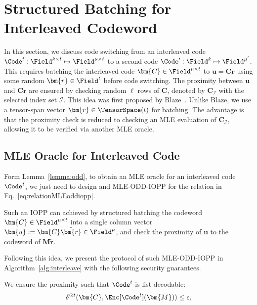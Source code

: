 \section{Structured Batching for Interleaved Codeword}
\label{sec:interleave}

In this section,
we discuss code switching from an interleaved code $\Code^t: \Field^{k\times t} \mapsto \Field^{\mu \times t}$ to a second code $\Code':\Field^{k} \mapsto \Field^{\mu'}$.
This requires batching the interleaved code $\bm{C} \in \Field^{\mu \times t}$ to $\bm{u} = \bm{C}\bm{r}$ using some random $\bm{r} \in \Field^t$ before code switching.
The proximity between $\bm{u}$ and $\bm{C}\bm{r}$ are ensured by checking random $\ell$ rows of $\bm{C}$, denoted by $\bm{C}_\mathcal{I}$ with the selected index set $\mathcal{I}$.
This idea was first proposed by Blaze~\cite{eurocrypt/BrehmCFRRZ25}.
Unlike Blaze, we use a tensor-span vector $\bm{r} \in \TensorSpace(t)$ for batching.
The advantage is that the proximity check is reduced to checking an MLE evaluation of $\bm{C}_\mathcal{I}$,
allowing it to be verified via another MLE oracle.




\subsection{MLE Oracle for Interleaved Code}
\label{sec:interleaveOracle}

Form Lemma~\ref{lemma:odd},
to obtain an MLE oracle for an interleaved code $\Code^t$,
we just need to design and MLE-ODD-IOPP for the relation in Eq.~\ref{eq:relationMLEoddiopp}.

Such an IOPP can achieved by structured batching the codeword $\bm{C}\in \Field^{\mu \times t}$
into a single column vector $\bm{u}:=\bm{C}\tilde{\bm{r}} \in \Field^\mu$,
and check the proximity of $\bm{u}$ to the codeword of $\bm{M}\tilde{\bm{r}}$.

Following this idea, we present the protocol of such MLE-ODD-IOPP in Algorithm~\ref{alg:interleave}
with the following security guarantees.

We ensure the proximity such that $\Code^t$ is list decodable:
\[
    \delta^{\odot t}(\bm{C}, \Enc[\Code^t](\bm{M})) \le \epsilon,
\]


